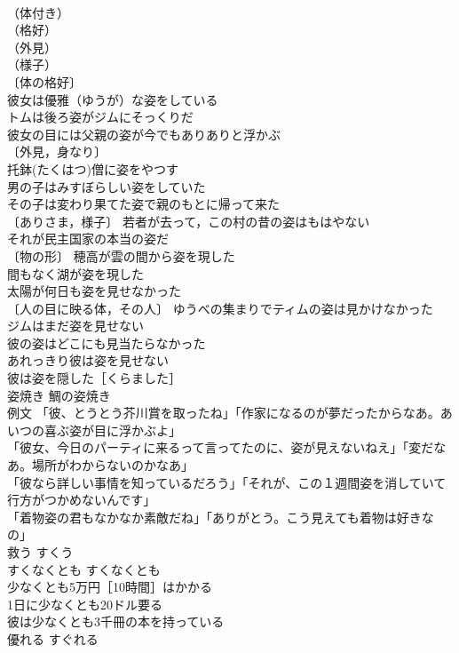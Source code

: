 \documentclass[8pt]{extreport}
\begin{document}
\begin{CJK}{UTF8}{min}
\\	（体付き）
\\	（格好）
\\	（外見）
\\	（様子）
\\	〔体の格好〕
\\	彼女は優雅（ゆうが）な姿をしている 
\\	トムは後ろ姿がジムにそっくりだ 
\\	彼女の目には父親の姿が今でもありありと浮かぶ 
\\	〔外見，身なり〕
\\	托鉢(たくはつ)僧に姿をやつす 
\\	男の子はみすぼらしい姿をしていた 
\\	その子は変わり果てた姿で親のもとに帰って来た 
\\	〔ありさま，様子〕 若者が去って，この村の昔の姿はもはやない 
\\	それが民主国家の本当の姿だ 
\\	〔物の形〕 穂高が雲の間から姿を現した 
\\	間もなく湖が姿を現した 
\\	太陽が何日も姿を見せなかった 
\\	〔人の目に映る体，その人〕 ゆうべの集まりでティムの姿は見かけなかった 
\\	ジムはまだ姿を見せない 
\\	彼の姿はどこにも見当たらなかった 
\\	あれっきり彼は姿を見せない 
\\	彼は姿を隠した［くらました］ 
\\	姿焼き 鯛の姿焼き 
\\	例文 「彼、とうとう芥川賞を取ったね」「作家になるのが夢だったからなあ。あいつの喜ぶ姿が目に浮かぶよ」 
\\	「彼女、今日のパーティに来るって言ってたのに、姿が見えないねえ」「変だなあ。場所がわからないのかなあ」 
\\	「彼なら詳しい事情を知っているだろう」「それが、この１週間姿を消していて行方がつかめないんです」 
\\	「着物姿の君もなかなか素敵だね」「ありがとう。こう見えても着物は好きなの」 
\\	救う	すくう	
\\	すくなくとも	すくなくとも	
\\	少なくとも5万円［10時間］はかかる 
\\	1日に少なくとも20ドル要る 
\\	彼は少なくとも3千冊の本を持っている 
\\	優れる	すぐれる	

\end{CJK}
\end{document}
